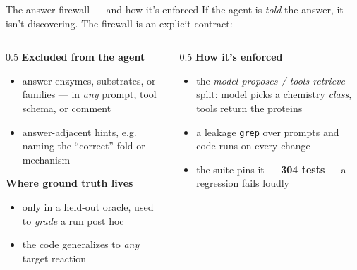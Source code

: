 \documentclass[aspectratio=169,11pt]{beamer}
\newcommand{\hl}[1]{{\color{brand}\textbf{#1}}}
\newcommand{\hlt}[1]{{\color{brand2}\textbf{#1}}}
\newcommand{\hla}[1]{{\color{accent}\textbf{#1}}}
\begin{document}
\begin{frame}{The answer firewall --- and how it's enforced}
  If the agent is \emph{told} the answer, it isn't discovering. The firewall is an
  explicit contract:
  \vspace{0.5em}
  \begin{columns}[T]
    \begin{column}{0.5\textwidth}
      \hla{Excluded from the agent}
      \begin{itemize}\small
        \item answer enzymes, substrates, or families --- in \emph{any} prompt, tool
          schema, or comment
        \item answer-adjacent hints, e.g. naming the ``correct'' fold or mechanism
      \end{itemize}
      \vspace{0.3em}
      \hlt{Where ground truth lives}
      \begin{itemize}\small
        \item only in a held-out oracle, used to \emph{grade} a run post hoc
        \item the code generalizes to \emph{any} target reaction
      \end{itemize}
    \end{column}
    \begin{column}{0.5\textwidth}
      \hl{How it's enforced}
      \begin{itemize}\small
        \item the \emph{model-proposes / tools-retrieve} split: model picks a chemistry
          \emph{class}, tools return the proteins
        \item a leakage \texttt{grep} over prompts and code runs on every change
        \item the suite pins it --- \hl{304 tests} --- a regression fails loudly
      \end{itemize}
    \end{column}
  \end{columns}
\end{frame}
\end{document}

